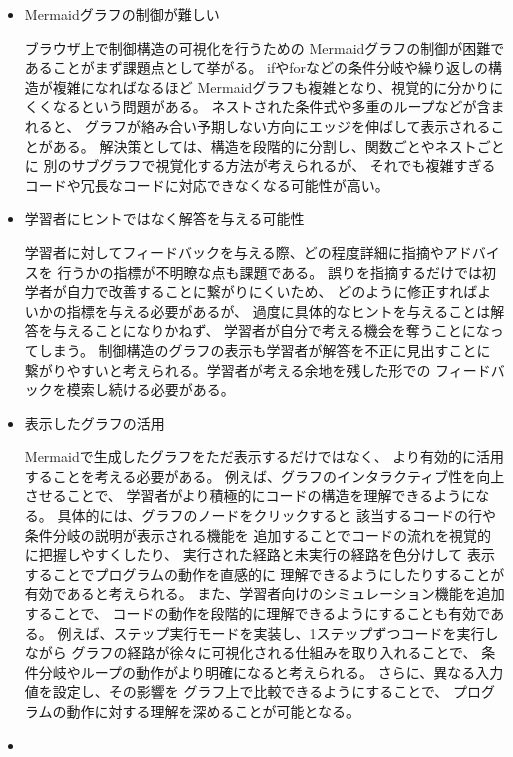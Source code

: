 \documentclass{cssspaper}
\begin{document}
        \begin{itemize}
            \item Mermaidグラフの制御が難しい
            
            ブラウザ上で制御構造の可視化を行うための
            Mermaidグラフの制御が困難であることがまず課題点として挙がる。
            ifやforなどの条件分岐や繰り返しの構造が複雑になればなるほど
            Mermaidグラフも複雑となり、視覚的に分かりにくくなるという問題がある。
            ネストされた条件式や多重のループなどが含まれると、
            グラフが絡み合い予期しない方向にエッジを伸ばして表示されることがある。
            解決策としては、構造を段階的に分割し、関数ごとやネストごとに
            別のサブグラフで視覚化する方法が考えられるが、
            それでも複雑すぎるコードや冗長なコードに対応できなくなる可能性が高い。

            \item 学習者にヒントではなく解答を与える可能性
            
            学習者に対してフィードバックを与える際、どの程度詳細に指摘やアドバイスを
            行うかの指標が不明瞭な点も課題である。
            誤りを指摘するだけでは初学者が自力で改善することに繋がりにくいため、
            どのように修正すればよいかの指標を与える必要があるが、
            過度に具体的なヒントを与えることは解答を与えることになりかねず、
            学習者が自分で考える機会を奪うことになってしまう。
            制御構造のグラフの表示も学習者が解答を不正に見出すことに
            繋がりやすいと考えられる。学習者が考える余地を残した形での
            フィードバックを模索し続ける必要がある。

            \item 表示したグラフの活用
            
            Mermaidで生成したグラフをただ表示するだけではなく、
            より有効的に活用することを考える必要がある。
            例えば、グラフのインタラクティブ性を向上させることで、
            学習者がより積極的にコードの構造を理解できるようになる。
            具体的には、グラフのノードをクリックすると
            該当するコードの行や条件分岐の説明が表示される機能を
            追加することでコードの流れを視覚的に把握しやすくしたり、
            実行された経路と未実行の経路を色分けして
            表示することでプログラムの動作を直感的に
            理解できるようにしたりすることが有効であると考えられる。
            また、学習者向けのシミュレーション機能を追加することで、
            コードの動作を段階的に理解できるようにすることも有効である。
            例えば、ステップ実行モードを実装し、1ステップずつコードを実行しながら
            グラフの経路が徐々に可視化される仕組みを取り入れることで、
            条件分岐やループの動作がより明確になると考えられる。
            さらに、異なる入力値を設定し、その影響を
            グラフ上で比較できるようにすることで、
            プログラムの動作に対する理解を深めることが可能となる。

            \item 
            
            

            

        \end{itemize}    
\end{document}
